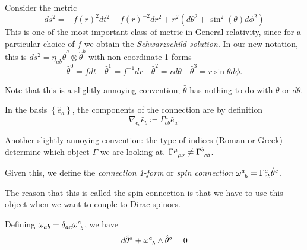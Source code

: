 \begin{example}[]
  Consider the metric
  \begin{equation}
    ds^2 = -f(r)^2 dt^2 + f(r)^{-2} dr^2 + r^2 (d \theta^2 + \sin^2(\theta) d\phi^2)
  \end{equation}
  This is one of the most important class of metric in General relativity, since for a particular choice of $f$ we obtain the \emph{Schwarzschild solution}.
  In our new notation, this is $ds^2 = \eta_{ab} \hat\theta^a \otimes \hat \theta^b$ with non-coordinate 1-forms
  \begin{equation}
    \hat\theta^0 = f dt \quad \hat\theta^1 = f^{-1} dr \quad \hat\theta^2 = r d\theta \quad \hat\theta^3 = r \sin \theta d\phi.
  \end{equation}
  \begin{leftbar}
    \begin{remark}
      Note that this is a slightly annoying convention; $\hat\theta$ has nothing to do with $\theta$ or $d\theta$.
    \end{remark}
  \end{leftbar}
  In the basis $\left\{ \hat e_a \right\}$, the components of the connection are by definition
  \begin{equation}
    \nabla_{\hat e_c} \hat e_b \coloneqq \Gamma^a_{cb} \hat e_a.
  \end{equation}
  \begin{leftbar}
    \begin{remark}
      Another slightly annoying convention: the type of indices (Roman or Greek) determine which object $\Gamma$ we are looking at.
      $\Gamma \indices{^{\mu}_{\rho\nu}} \neq \Gamma \indices{^b_{cb}}$.
    \end{remark}
  \end{leftbar}
  \begin{definition}[]
    Given this, we define the \emph{connection 1-form} or \emph{spin connection} $\omega \indices{^a_b} = \Gamma^{a}_{cb} \hat\theta^c$.
  \end{definition}
  \begin{leftbar}
    \begin{remark}
      The reason that this is called the spin-connection is that we have to use this object when we want to couple to Dirac spinors.
    \end{remark}
  \end{leftbar}
\end{example}
\begin{claim}
  Defining $\omega_{ab} = \delta_{ac} \omega \indices{^c_b}$, we have
  \begin{equation}
    d\hat\theta^a + \omega \indices{^a_b} \wedge \hat\theta^b = 0
  \end{equation}
\end{claim}
